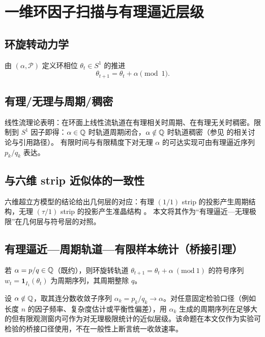 \section{一维环因子扫描与有理逼近层级}

\subsection{环旋转动力学}

由 $(\alpha,\mathcal{P})$ 定义环相位 $\theta_t\in S^1$ 的推进
\[
\theta_{t+1}=\theta_t+\alpha\pmod 1.
\]

\subsection{有理/无理与周期/稠密}

线性流理论表明：在环面上线性流轨道在有理相关时周期、在有理无关时稠密。限制到 $S^1$ 因子即得：$\alpha\in\mathbb{Q}$ 时轨道周期闭合，$\alpha\notin\mathbb{Q}$ 时轨道稠密（参见 \cite{WikipediaSturmianWord} 的相关讨论与引用路径）。
有限时间与有限精度下对无理 $\alpha$ 的可达实现可由有理逼近序列 $p_k/q_k$ 表达。

\subsection{与六维 strip 近似体的一致性}

六维超立方模型的结论给出几何层的对应：有理 $(1/1)$ strip 的投影产生周期结构，无理 $(\tau/1)$ strip 的投影产生准晶结构 \cite{PRB46_6091}。
本文将其作为“有理逼近—无理极限”在几何层与符号层的对照。

\subsection{有理逼近—周期轨道—有限样本统计（桥接引理）}

\begin{lemma}[有理参数的周期性]\label{lem:rational-periodic}
若 $\alpha=p/q\in\mathbb{Q}$（既约），则环旋转轨道 $\theta_{t+1}=\theta_t+\alpha\ (\mathrm{mod}\ 1)$ 的符号序列 $w_t=\mathbf{1}_{I_1}(\theta_t)$ 为周期序列，其周期整除 $q$。
\end{lemma}

\begin{proposition}\label{prop:finite-sample-approx-hierarchy}
设 $\alpha\notin\mathbb{Q}$，取其连分数收敛子序列 $\alpha_k=p_k/q_k\to\alpha$。对任意固定检验口径（例如长度 $n$ 的因子频率、复杂度估计或平衡性偏差），用 $\alpha_k$ 生成的周期序列在足够大的但有限观测窗内可作为对无理极限统计的近似层级。该命题在本文仅作为实验可检验的桥接口径使用，不在一般性上断言统一收敛速率。
\end{proposition}

